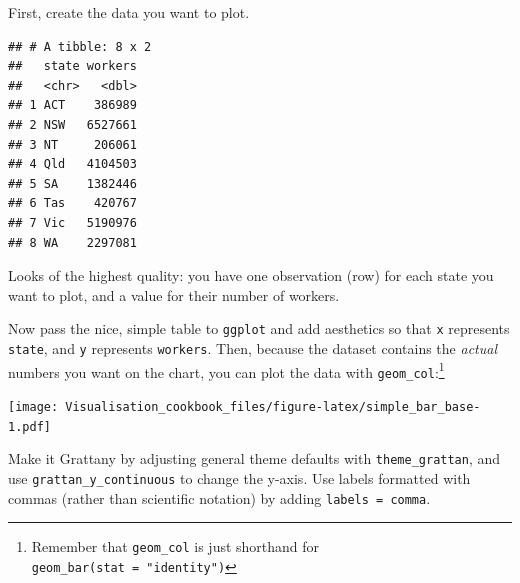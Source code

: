\documentclass[]{book}
\newenvironment{Shaded}{\begin{snugshade}}{\end{snugshade}}
\newcommand{\DataTypeTok}[1]{\textcolor[rgb]{0.13,0.29,0.53}{#1}}
\newcommand{\DecValTok}[1]{\textcolor[rgb]{0.00,0.00,0.81}{#1}}
\newcommand{\KeywordTok}[1]{\textcolor[rgb]{0.13,0.29,0.53}{\textbf{#1}}}
\newcommand{\NormalTok}[1]{#1}
\newcommand{\OperatorTok}[1]{\textcolor[rgb]{0.81,0.36,0.00}{\textbf{#1}}}
\newcommand{\StringTok}[1]{\textcolor[rgb]{0.31,0.60,0.02}{#1}}
\let\rmarkdownfootnote\footnote%
\def\footnote{\protect\rmarkdownfootnote}
\begin{document}
First, create the data you want to plot.

\begin{Shaded}
\end{Shaded}

\begin{verbatim}
## # A tibble: 8 x 2
##   state workers
##   <chr>   <dbl>
## 1 ACT    386989
## 2 NSW   6527661
## 3 NT     206061
## 4 Qld   4104503
## 5 SA    1382446
## 6 Tas    420767
## 7 Vic   5190976
## 8 WA    2297081
\end{verbatim}

Looks of the highest quality: you have one observation (row) for each state you want to plot, and a value for their number of workers.

Now pass the nice, simple table to \texttt{ggplot} and add aesthetics so that \texttt{x} represents \texttt{state}, and \texttt{y} represents \texttt{workers}. Then, because the dataset contains the \emph{actual} numbers you want on the chart, you can plot the data with \texttt{geom\_col}:\footnote{Remember that \texttt{geom\_col} is just shorthand for \texttt{geom\_bar(stat\ =\ "identity")}}

\begin{Shaded}
\end{Shaded}

\texttt{[image: Visualisation\_cookbook\_files/figure-latex/simple\_bar\_base-1.pdf]}

Make it Grattany by adjusting general theme defaults with \texttt{theme\_grattan}, and use \texttt{grattan\_y\_continuous} to change the y-axis. Use labels formatted with commas (rather than scientific notation) by adding \texttt{labels\ =\ comma}.
\end{document}
